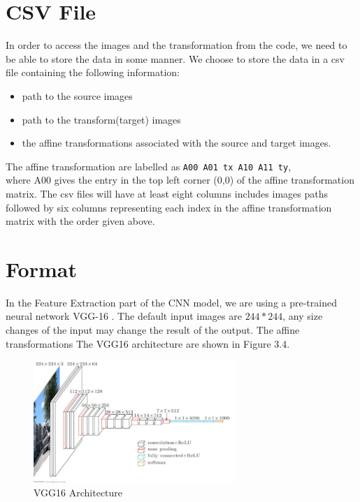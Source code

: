 \section{CSV File}
In order to access the images and the transformation from the code, we need to be able to store the data in some manner. We choose to store the data in a csv file containing the following information: 
\begin{itemize}
\item path to the source images
\item path to the transform(target) images
\item the affine transformations associated with the source and target images.
\end{itemize}
The affine transformation are labelled as \verb+A00 A01 tx A10 A11 ty+,\\
where A00 gives the entry in the top left corner (0,0) of the affine transformation matrix. The csv files will have at least eight columns includes images paths followed by six columns representing each index in the affine transformation matrix with the order given above.

\section{Format}
In the Feature Extraction part of the CNN model, we are using a pre-trained neural network VGG-16 \cite{simonyan2014very}. The default input images are $ 244 * 244 $, any size changes of the input may change the result of the output. The affine transformations  The VGG16 architecture are shown in Figure 3.4. 
\begin{figure}
 \centering
    \includegraphics[width=3.0in]{figs/vgg16_architecture}
    \caption{VGG16 Architecture\cite{vgg_arch}}
\end{figure}

